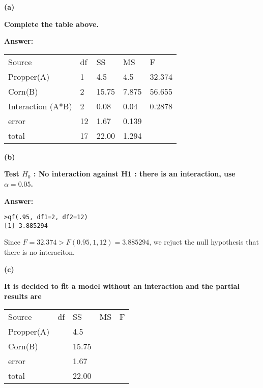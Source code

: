 \documentclass[letterpaper,11pt]{article}
\begin{document}
  \bigbreak

  \begin{addmargin}[-1.1em]{0em}
  \textbf{(a)}\par\end{addmargin}
    \textbf{Complete the table above.}\par
  \bigbreak
  \begin{addmargin}[-0.5em]{0em}
  \textbf{Answer: }\end{addmargin}

  \begin{center}
  \begin{tabular}{ p{5cm}p{1cm}p{1.5cm}p{1.5cm}p{1.5cm}}
  \centering Source & df & SS & MS & F\\
  \centering Propper(A) & 1 & 4.5 & 4.5 & 32.374\\
  \centering Corn(B) & 2 & 15.75 & 7.875 & 56.655\\
  \centering Interaction (A*B) & 2 & 0.08 & 0.04 & 0.2878\\
  \centering error & 12 & 1.67 & 0.139 & {}\\
  \centering total & 17 & 22.00 & 1.294 & {}\\
  \end{tabular}
  \end{center}


  \bigbreak
  \begin{addmargin}[-1.1em]{0em}
  \textbf{(b)}\par\end{addmargin}
    \textbf{Test $H_0$ : No interaction against H1 : there is an interaction, use $\alpha = 0.05$.}\par
  \bigbreak
  \begin{addmargin}[-0.5em]{0em}
  \textbf{Answer: }\end{addmargin}


\begin{lstlisting}
>qf(.95, df1=2, df2=12)
[1] 3.885294
\end{lstlisting}
Since $F = 32.374 > F(0.95,1,12) = 3.885294$, we rejuct the null hypothesis that there is no interaciton.

  \bigbreak
  \begin{addmargin}[-1.1em]{0em}
  \textbf{(c)}\par\end{addmargin}
    \textbf{It is decided to fit a model without an interaction and the partial results are}\par

    \begin{center}
    \begin{tabular}{ p{5cm}p{1cm}p{1cm}p{1cm}p{1cm}}
    \centering Source & df & SS & MS & F\\
    \centering Propper(A) & {} & 4.5 & {} &\\
    \centering Corn(B) & {} & 15.75 & {} & {}\\
    \centering error & {} & 1.67 & {} & {}\\
    \centering total & {} & 22.00 & {} & {}\\
    \end{tabular}
    \end{center}
\end{document}
